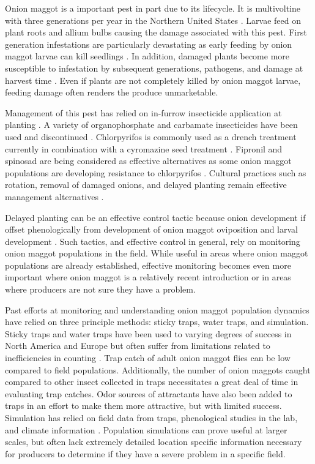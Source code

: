 \documentclass[alpha-refs]{wiley-article}
\begin{document}
Onion maggot is a important pest in part due to its lifecycle.  It is multivoltine with three generations per year in the Northern United States \citep{eckenrode1975population, hoepting2004insecticide}.  Larvae feed on plant roots and allium bulbs causing the damage associated with this pest.  First generation infestations are particularly devastating as early feeding by onion maggot larvae can kill seedlings \citep{nault2006onion, nault2006performance}.  In addition, damaged plants become more susceptible to infestation by subsequent generations, pathogens, and damage at harvest time \citep{eckenrode1986impact,nault2006performance}.  Even if plants are not completely killed by onion maggot larvae, feeding damage often renders the produce unmarketable.  

Management of this pest has relied on in-furrow insecticide application at planting \citep{nault2006performance}.  A variety of organophosphate and carbamate insecticides have been used and discontinued \citep{nault2006performance}.  Chlorpyrifos is commonly used as a drench treatment currently in combination with a cyromazine seed treatment \citep{nault2006performance}.  Fipronil and spinosad are being considered as effective alternatives as some onion maggot populations are developing resistance to chlorpyrifos \citep{nault2006onion}.  Cultural practices such as rotation, removal of damaged onions, and delayed planting remain effective management alternatives \citep{martinson1988dispersal, finch1985influence, nault2011delaying}.  

Delayed planting can be an effective control tactic because onion development if offset phenologically from development of onion maggot oviposition and larval development \citep{nault2011delaying}.  Such tactics, and effective control in general, rely on monitoring onion maggot populations in the field.  While useful in areas where onion maggot populations are already established, effective monitoring becomes even more important where onion maggot is a relatively recent introduction or in areas where producers are not sure they have a problem.  

Past efforts at monitoring and understanding onion maggot population dynamics have relied on three principle methods: sticky traps, water traps, and simulation.  Sticky traps and water traps have been used to varying degrees of success in North America and Europe but often suffer from limitations related to inefficiencies in counting \citep{thomingdeveloping,otto2000development}.  Trap catch of adult onion maggot flies can be low compared to field populations.  Additionally, the number of onion maggots caught compared to other insect collected in traps necessitates a great deal of time in evaluating trap catches.  Odor sources of attractants have also been added to traps in an effort to make them more attractive, but with limited success.  Simulation has relied on field data from traps, phenological studies in the lab, and climate information \citep{thomingdeveloping,otto2000development,ning2017predicting}.  Population simulations can prove useful at larger scales, but often lack extremely detailed location specific information necessary for producers to determine if they have a severe problem in a specific field.  
\end{document}

